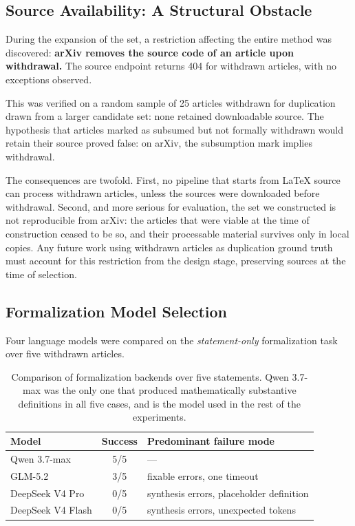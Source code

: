 \subsection{Source Availability: A Structural Obstacle}
\label{ssec:fuentes}

During the expansion of the set, a restriction affecting the entire method was discovered: \textbf{arXiv removes the source code of an article upon withdrawal.} The source endpoint returns 404 for withdrawn articles, with no exceptions observed.

This was verified on a random sample of 25 articles withdrawn for duplication drawn from a larger candidate set: none retained downloadable source. The hypothesis that articles marked as subsumed but not formally withdrawn would retain their source proved false: on arXiv, the subsumption mark implies withdrawal.

The consequences are twofold. First, no pipeline that starts from LaTeX source can process withdrawn articles, unless the sources were downloaded before withdrawal. Second, and more serious for evaluation, the set we constructed is not reproducible from arXiv: the articles that were viable at the time of construction ceased to be so, and their processable material survives only in local copies. Any future work using withdrawn articles as duplication ground truth must account for this restriction from the design stage, preserving sources at the time of selection.

\subsection{Formalization Model Selection}

Four language models were compared on the \textit{statement-only} formalization task over five withdrawn articles.

\begin{table}[htbp]
\centering
\small
\begin{tabular}{lcl}
\toprule
Model & Success & Predominant failure mode \\
\midrule
Qwen 3.7-max      & 5/5 & --- \\
GLM-5.2           & 3/5 & fixable errors, one timeout \\
DeepSeek V4 Pro   & 0/5 & synthesis errors, placeholder definition \\
DeepSeek V4 Flash & 0/5 & synthesis errors, unexpected tokens \\
\bottomrule
\end{tabular}
\caption{Comparison of formalization backends over five statements. Qwen 3.7-max was the only one that produced mathematically substantive definitions in all five cases, and is the model used in the rest of the experiments.}
\label{tab:modelos}
\end{table}

